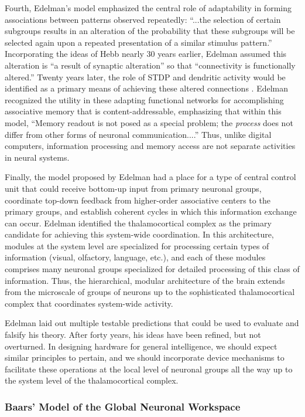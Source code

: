 Fourth, Edelman's model emphasized the central role of adaptability in forming associations between patterns observed repeatedly: ``...the selection of certain subgroups results in an alteration of the probability that these subgroups will be selected again upon a repeated presentation of a similar stimulus pattern.'' Incorporating the ideas of Hebb nearly 30 years earlier, Edelman assumed this alteration is ``a result of synaptic alteration'' so that ``connectivity is functionally altered.'' Twenty years later, the role of STDP and dendritic activity would be identified as a primary means of achieving these altered connections \cite{bipo1998,pome2001}. Edelman recognized the utility in these adapting functional networks for accomplishing associative memory that is content-addressable, emphasizing that within this model, ``Memory readout is not posed as a special problem; the \textit{process} does not differ from other forms of neuronal communication....'' Thus, unlike digital computers, information processing and memory access are not separate activities in neural systems.

Finally, the model proposed by Edelman had a place for a type of central control unit that could receive bottom-up input from primary neuronal groups, coordinate top-down feedback from higher-order associative centers to the primary groups, and establish coherent cycles in which this information exchange can occur. Edelman identified the thalamocortical complex as the primary candidate for achieving this system-wide coordination. In this architecture, modules at the system level are specialized for processing certain types of information (visual, olfactory, language, etc.), and each of these modules comprises many neuronal groups specialized for detailed  processing of this class of information. Thus, the hierarchical, modular architecture of the brain extends from the microscale of groups of neurons up to the sophisticated thalamocortical complex that coordinates system-wide activity. 

Edelman laid out multiple testable predictions that could be used to evaluate and falsify his theory. After forty years, his ideas have been refined, but not overturned. In designing hardware for general intelligence, we should expect similar principles to pertain, and we should incorporate device mechanisms to facilitate these operations at the local level of neuronal groups all the way up to the system level of the thalamocortical complex.

\subsubsection{Baars' Model of the Global Neuronal Workspace}

